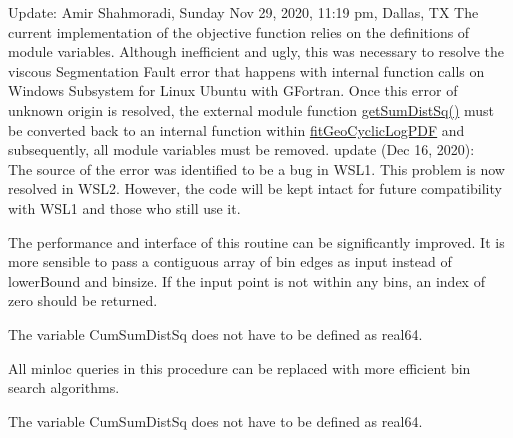 \begin{DoxyRefList}
\item[Subprogram \mbox{\hyperlink{namespaceFitGeoCyclic__mod_a1c31498edcd69664be787f9942aaecea}{Fit\+Geo\+Cyclic\+\_\+mod\+::fit\+Geo\+Cyclic\+Log\+PDF}} (max\+Num\+Trial, num\+Trial, Success\+Step, Log\+Count)]\label{todo__todo000033}%
%
 Update\+: Amir Shahmoradi, Sunday Nov 29, 2020, 11\+:19 pm, Dallas, TX The current implementation of the objective function relies on the definitions of module variables. Although inefficient and ugly, this was necessary to resolve the viscous Segmentation Fault error that happens with internal function calls on Windows Subsystem for Linux Ubuntu with GFortran. Once this error of unknown origin is resolved, the external module function {\ttfamily \mbox{\hyperlink{namespaceFitGeoCyclic__mod_a2bc7f171d922a5311da63e9ea3ad1603}{get\+Sum\+Dist\+Sq()}}} must be converted back to an internal function within \mbox{\hyperlink{namespaceFitGeoCyclic__mod_a1c31498edcd69664be787f9942aaecea}{fit\+Geo\+Cyclic\+Log\+PDF}} and subsequently, all module variables must be removed. update (Dec 16, 2020)\+: ~\newline
 The source of the error was identified to be a bug in WSL1. This problem is now resolved in WSL2. However, the code will be kept intact for future compatibility with WSL1 and those who still use it. 
\item[Subprogram \mbox{\hyperlink{namespaceHistogram__mod_ad80a9c34cbdd54d1c6b5d652c4def668}{Histogram\+\_\+mod\+::get\+Bin}} (x, lower\+Bound, nbin, binsize)]\label{todo__todo000034}%
%
 The performance and interface of this routine can be significantly improved. It is more sensible to pass a {\ttfamily contiguous} array of bin edges as input instead of {\ttfamily lower\+Bound} and {\ttfamily binsize}. If the input point is not within any bins, an index of zero should be returned. 
\item[Subprogram \mbox{\hyperlink{namespaceKmeans__mod_ac4b9beeaf1a19b79cfd5aacb8915fb02}{Kmeans\+\_\+mod\+::run\+KPP}} (nc, nd, np, Point, Sum\+Point, Membership, Size, potential)]\label{todo__todo000036}%
%
 The variable {\ttfamily Cum\+Sum\+Dist\+Sq} does not have to be defined as {\ttfamily real64}.

\label{todo__todo000035}%
%
 All {\ttfamily minloc} queries in this procedure can be replaced with more efficient bin search algorithms. 
\item[Subprogram \mbox{\hyperlink{namespaceKmeansOOP__mod_af12decb1817c7b3691239edf3ef79eff}{Kmeans\+OOP\+\_\+mod\+::run\+KPP}} (nc, nd, np, Point, Sum\+Point, Membership, Size, potential)]\label{todo__todo000038}%
%
 The variable {\ttfamily Cum\+Sum\+Dist\+Sq} does not have to be defined as {\ttfamily real64}.


\end{DoxyRefList}
